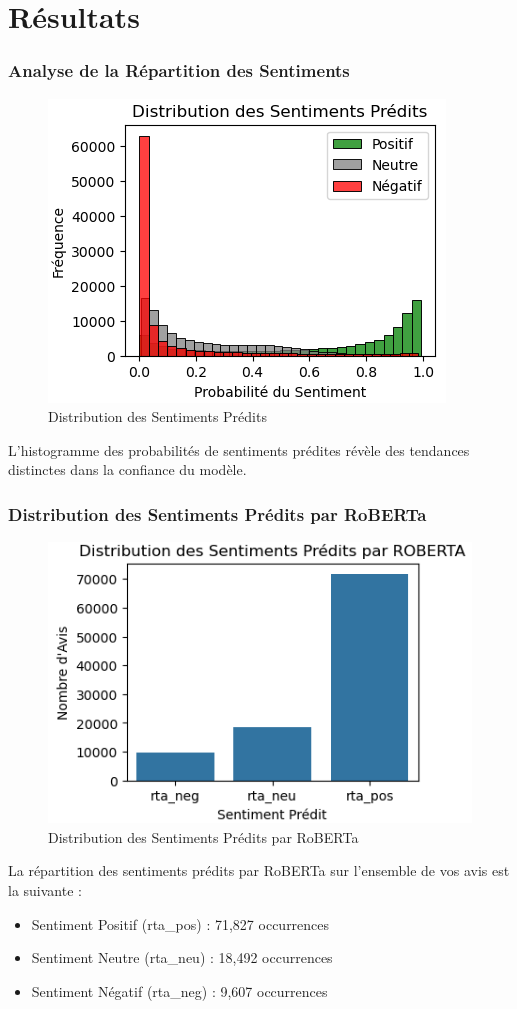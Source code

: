 \section{Résultats}

\begin{frame}
    \frametitle{Analyse de la Répartition des Sentiments}
    \begin{figure}
        \includegraphics[scale=0.6]{Figures/distributionsentimentsRoberta.PNG}
        \caption{Distribution des Sentiments Prédits}
    \end{figure}
    L'histogramme des probabilités de sentiments prédites révèle des tendances distinctes dans la confiance du modèle.
\end{frame}

\begin{frame}
    \frametitle{Distribution des Sentiments Prédits par RoBERTa}
    \begin{figure}
        \includegraphics[scale=0.4]{Figures/distributiondessentimentRoberta.PNG}
        \caption{Distribution des Sentiments Prédits par RoBERTa}
    \end{figure}
    La répartition des sentiments prédits par RoBERTa sur l'ensemble de vos avis est la suivante :
    \begin{itemize}
        \item Sentiment Positif (rta\_pos) : 71,827 occurrences
        \item Sentiment Neutre (rta\_neu) : 18,492 occurrences
        \item Sentiment Négatif (rta\_neg) : 9,607 occurrences
    \end{itemize}
\end{frame}

